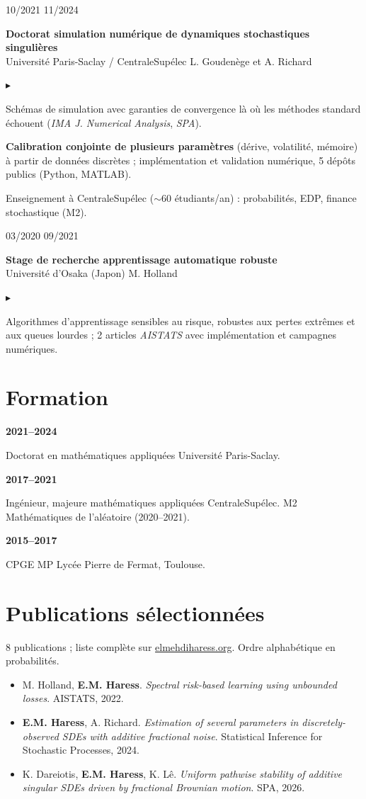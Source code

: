 \documentclass[10pt,a4paper]{article}
\newlength{\datecol}\setlength{\datecol}{0.155\textwidth}
\newlength{\gutter}\setlength{\gutter}{0.85em}
\newlength{\bodycol}
\newcommand{\entry}[3]{%
  \par\vspace{0.55ex}\noindent
  \begin{minipage}[t]{\datecol}
    \vspace{0pt}\raggedright\footnotesize\color{muted}#1
  \end{minipage}%
  \hspace{\gutter}%
  \begin{minipage}[t]{\bodycol}
    \vspace{0pt}\raggedright
    {\headingfont\bfseries\footnotesize #2}\\[0.08ex]
    {\footnotesize\color{accent}#3}
  \end{minipage}%
  \par\vspace{0.12ex}
}
\newenvironment{bullets}
  {\begin{list}{\textcolor{accent}{\scriptsize$\blacktriangleright$}}{%
      \setlength{\leftmargin}{\datecol}
      \addtolength{\leftmargin}{\gutter}
      \addtolength{\leftmargin}{1.15em}
      \setlength{\rightmargin}{0pt}
      \setlength{\labelwidth}{0.85em}
      \setlength{\labelsep}{0.3em}
      \setlength{\itemsep}{0.08ex}
      \setlength{\parsep}{0pt}
      \setlength{\topsep}{0.2ex}
      \setlength{\partopsep}{0pt}
      \footnotesize}}
  {\end{list}}
\newcommand{\skillrow}[2]{%
  \par\noindent
  \begin{minipage}[t]{\datecol}
    \vspace{0pt}\raggedright{\headingfont\bfseries\footnotesize #1}
  \end{minipage}%
  \hspace{\gutter}%
  \begin{minipage}[t]{\bodycol}
    \vspace{0pt}\raggedright\footnotesize #2
  \end{minipage}%
  \par\vspace{0.38ex}
}
\begin{document}
\entry{10/2021 \textemdash{} 11/2024}{Doctorat \textemdash{} simulation numérique de dynamiques stochastiques singulières}{Université Paris-Saclay / CentraleSupélec \textemdash{} L. Goudenège et A. Richard}
\begin{bullets}
  \item Schémas de simulation avec garanties de convergence là où les méthodes standard échouent
  (\emph{IMA J. Numerical Analysis}, \emph{SPA}).
  \item \textbf{Calibration conjointe de plusieurs paramètres} (dérive, volatilité, mémoire) à partir de
  données discrètes ; implémentation et validation numérique, 5 dépôts publics (Python, MATLAB).
  \item Enseignement à CentraleSupélec ($\sim$60 étudiants/an) : probabilités, EDP, finance stochastique (M2).
\end{bullets}

\entry{03/2020 \textemdash{} 09/2021}{Stage de recherche \textemdash{} apprentissage automatique robuste}{Université d'Osaka (Japon) \textemdash{} M. Holland}
\begin{bullets}
  \item Algorithmes d'apprentissage sensibles au risque, robustes aux pertes extrêmes et aux queues lourdes ;
  2 articles \emph{AISTATS} avec implémentation et campagnes numériques.
\end{bullets}

\section{Formation}
\skillrow{2021--2024}{Doctorat en mathématiques appliquées \textemdash{} Université Paris-Saclay.}
\skillrow{2017--2021}{Ingénieur, majeure mathématiques appliquées \textemdash{} CentraleSupélec. M2 Mathématiques de l'aléatoire (2020--2021).}
\skillrow{2015--2017}{CPGE MP \textemdash{} Lycée Pierre de Fermat, Toulouse.}

\section{Publications sélectionnées}
{\scriptsize\color{muted}8 publications ; liste complète sur \href{https://elmehdiharess.org}{elmehdiharess.org}. Ordre alphabétique en probabilités.\par}
\vspace{0.25ex}
\begin{itemize}[leftmargin=1.15em, itemsep=0.12ex, topsep=0pt, parsep=0pt, label={\textcolor{accent}{\scriptsize$\blacktriangleright$}}]
  \scriptsize
  \item M. Holland, \textbf{E.M. Haress}. \emph{Spectral risk-based learning using unbounded losses}. AISTATS, 2022.
  \item \textbf{E.M. Haress}, A. Richard. \emph{Estimation of several parameters in discretely-observed SDEs
  with additive fractional noise}. Statistical Inference for Stochastic Processes, 2024.
  \item K. Dareiotis, \textbf{E.M. Haress}, K. Lê. \emph{Uniform pathwise stability of additive singular SDEs
  driven by fractional Brownian motion}. SPA, 2026.
\end{itemize}
\end{document}
